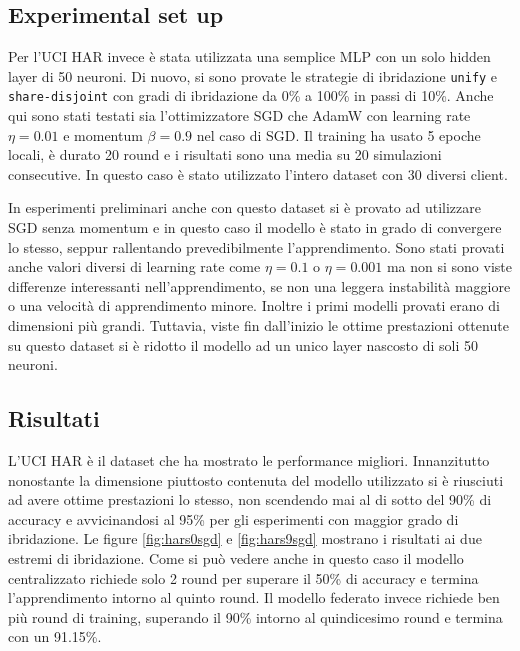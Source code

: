 \subsection{Experimental set up}
Per l'UCI HAR invece è stata utilizzata una semplice MLP con un solo 
hidden layer di 50 neuroni. Di nuovo, si sono provate le 
strategie di ibridazione \texttt{unify} e \texttt{share-disjoint} con 
gradi di ibridazione da 0\% a 100\% in passi di 10\%. Anche qui sono 
stati testati sia l'ottimizzatore SGD che AdamW con learning rate 
\(\eta = 0.01\) e momentum \(\beta = 0.9\) nel caso di SGD. Il 
training ha usato 5 epoche locali, è durato 20 round e i risultati 
sono una media su 20 simulazioni consecutive. In questo caso è stato 
utilizzato l'intero dataset con 30 diversi client.

In esperimenti preliminari anche con questo dataset si è provato ad 
utilizzare SGD senza momentum e in questo caso il modello è stato in 
grado di convergere lo stesso, seppur rallentando prevedibilmente 
l'apprendimento. Sono stati provati anche valori diversi di learning 
rate come \(\eta = 0.1\) o \(\eta = 0.001\) ma non si sono viste 
differenze interessanti nell'apprendimento, se non una leggera 
instabilità maggiore o una velocità di apprendimento minore.
Inoltre i primi modelli provati erano di dimensioni più grandi. 
Tuttavia, viste fin dall'inizio le ottime prestazioni ottenute su 
questo dataset si è ridotto il modello ad un unico layer nascosto di 
soli 50 neuroni.


\subsection{Risultati}
L'UCI HAR è il dataset che ha mostrato le performance migliori.
Innanzitutto nonostante la dimensione piuttosto contenuta del modello
utilizzato si è riusciuti ad avere ottime prestazioni lo stesso, non 
scendendo mai al di sotto del 90\% di accuracy e avvicinandosi al 
95\% per gli esperimenti con maggior grado di ibridazione. Le 
figure \ref{fig:hars0sgd} e \ref{fig:hars9sgd} mostrano i risultati 
ai due estremi di ibridazione.
Come si può vedere anche in questo caso il modello centralizzato 
richiede solo 2 round per superare il 50\% di accuracy e termina 
l'apprendimento intorno al quinto round. Il modello federato invece
richiede ben più round di training, superando il 90\% intorno al 
quindicesimo round e termina con un 91.15\%.


